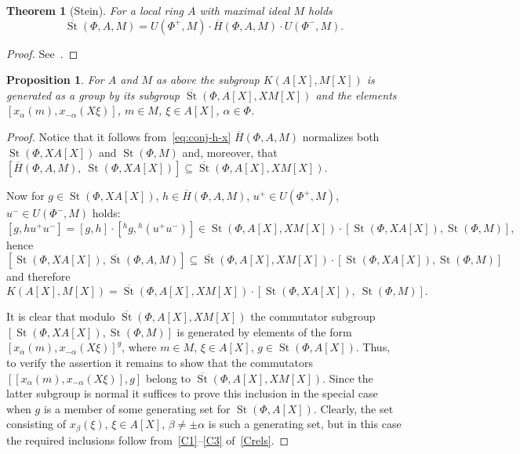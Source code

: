 \documentclass[oneside, 8pt]{amsart}
\newtheorem{prop}{Proposition}
\newtheorem{theorem}{Theorem}
\theoremstyle{remark}
\theoremstyle{definition}
\DeclareMathOperator{\St}{St}
\numberwithin{equation}{section}
\begin{document}
\begin{theorem}[Stein] \label{thmStein} For a local ring $A$ with maximal ideal $M$ holds \[\overline{\St}(\Phi, A, M) = U(\Phi^+, M) \cdot \overline{H}(\Phi, A, M) \cdot U(\Phi^-, M).\] \end{theorem} \begin{proof} See~\cite[Theorem~2.4]{Ste73}. \end{proof}

\begin{prop} \label{Kgen}
For $A$ and $M$ as above the subgroup $K(A[X], M[X])$ is generated as a group by its subgroup $\overline{\St}(\Phi, A[X], XM[X])$ and
 the elements $[x_\alpha(m), x_{-\alpha}(X\xi)]$, $m \in M$, $\xi \in A[X]$, $\alpha \in \Phi$. \end{prop}
\begin{proof}
 Notice that it follows from~\eqref{eq:conj-h-x} $\overline{H}(\Phi, A, M)$ normalizes both $\St(\Phi, XA[X])$ and $\St(\Phi, M)$ and, moreover, that $[\overline{H}(\Phi, A, M),\ \St(\Phi, XA[X])] \subseteq \overline{\St}(\Phi, A[X], XM[X])$. 
 
Now for $g \in \St(\Phi, XA[X])$, $h \in \overline{H}(\Phi, A, M)$, $u^+ \in U(\Phi^+, M)$, $u^- \in U(\Phi^-, M)$ holds:
\[ [g, h u^+ u^-] = [g, h] \cdot [{}^{h}\!g, {}^{h}\!(u^+u^-)] \in \St(\Phi, A[X], XM[X]) \cdot [\St(\Phi, XA[X]), \St(\Phi, M)],\]
hence $\left[\St(\Phi, XA[X]), \overline{\St}(\Phi, A, M)\right] \subseteq \overline{\St}(\Phi, A[X], XM[X]) \cdot \left[\St(\Phi, XA[X]), \St(\Phi, M)\right]$ and therefore \[K(A[X], M[X]) = \overline{\St}(\Phi, A[X], XM[X]) \cdot \left[\St(\Phi, XA[X]),\ \St(\Phi, M)\right].\]
 
It is clear that modulo $\overline{\St}(\Phi, A[X], XM[X])$ the commutator subgroup $[\St(\Phi, XA[X]), \St(\Phi, M)]$ is generated by elements of the form $[x_\alpha(m), x_{-\alpha}(X\xi)]^g$, where $m \in M$, $\xi \in A[X]$, $g \in \St(\Phi, A[X])$.
Thus, to verify the assertion it remains to show that the commutators $[[x_\alpha(m), x_{-\alpha}(X\xi)], g]$ belong to $\overline{\St}(\Phi, A[X], XM[X])$.
Since the latter subgroup is normal it suffices to prove this inclusion in the special case when $g$ is a member of some generating set for $\St(\Phi, A[X])$.
Clearly, the set consisting of $x_\beta(\xi)$, $\xi \in A[X]$, $\beta \neq \pm \alpha$ is such a generating set, but in this case the required inclusions follow from~\eqref{C1}--\eqref{C3} of~\cref{Crels}. \end{proof}
\end{document}
